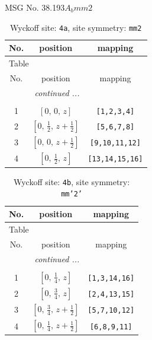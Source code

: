 \documentclass[fleqn,8pt]{jsarticle}
\begin{document}
\setcounter{MaxMatrixCols}{32}

\renewcommand{\tablename}{Table~}
\renewcommand{\figurename}{Figure~}
\begin{center}
\LARGE
MSG No. 38.193\quad$A_{b}mm2$
\end{center}
\renewcommand{\arraystretch}{1.2}
\begin{longtable}{ccc}
\caption{Wyckoff site: {\tt 4a}, site symmetry: {\tt mm2}}
 \\
 \hline \hline
No. & position & mapping \\ \hline \endfirsthead

\multicolumn{2}{l}{\tablename\ \thetable{}} \\
 \hline \hline
No. & position & mapping \\ \hline \endhead

 \hline \hline
\multicolumn{2}{r}{\footnotesize\it continued ...} \\ \endfoot

 \hline \hline
\multicolumn{2}{r}{} \\ \endlastfoot

1 & $\left[ 0,\, 0,\, z \right]$ & {\tt [1,2,3,4]} \\ \hline
2 & $\left[ 0,\, \frac{1}{2},\, z + \frac{1}{2} \right]$ & {\tt [5,6,7,8]} \\ \hline
3 & $\left[ 0,\, 0,\, z + \frac{1}{2} \right]$ & {\tt [9,10,11,12]} \\ \hline
4 & $\left[ 0,\, \frac{1}{2},\, z \right]$ & {\tt [13,14,15,16]} \\
\end{longtable}
\renewcommand{\arraystretch}{1.2}
\begin{longtable}{ccc}
\caption{Wyckoff site: {\tt 4b}, site symmetry: {\tt mm'2'}}
 \\
 \hline \hline
No. & position & mapping \\ \hline \endfirsthead

\multicolumn{2}{l}{\tablename\ \thetable{}} \\
 \hline \hline
No. & position & mapping \\ \hline \endhead

 \hline \hline
\multicolumn{2}{r}{\footnotesize\it continued ...} \\ \endfoot

 \hline \hline
\multicolumn{2}{r}{} \\ \endlastfoot

1 & $\left[ 0,\, \frac{1}{4},\, z \right]$ & {\tt [1,3,14,16]} \\ \hline
2 & $\left[ 0,\, \frac{3}{4},\, z \right]$ & {\tt [2,4,13,15]} \\ \hline
3 & $\left[ 0,\, \frac{3}{4},\, z + \frac{1}{2} \right]$ & {\tt [5,7,10,12]} \\ \hline
4 & $\left[ 0,\, \frac{1}{4},\, z + \frac{1}{2} \right]$ & {\tt [6,8,9,11]} \\
\end{longtable}
\end{document}
